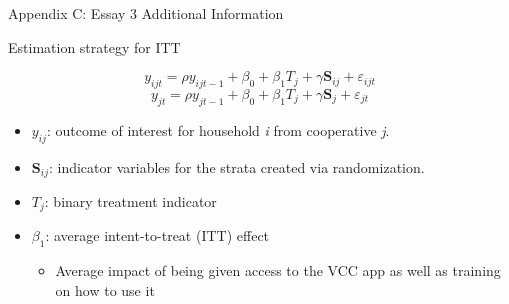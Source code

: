 \documentclass[aspectratio=169]{beamer}
\newenvironment{wideitemize}{\itemize\addtolength{\itemsep}{10pt}}{\enditemize}
\begin{document}
\begin{frame}{Appendix C: Essay 3 Additional Information}

\begin{wideitemize}
    \item Estimation strategy for ITT

\begin{equation} \label{eq:ITT1}
y_{ijt} = \rho y_{ijt-1} + \beta_{0} + \beta_{1} T_{j} + \gamma \textbf{S}_{ij} + \varepsilon_{ijt}
\end{equation}
\begin{equation} \label{eq:ITT2}
y_{jt} = \rho y_{jt-1} + \beta_{0} + \beta_{1} T_{j} + \gamma \textbf{S}_{j} + \varepsilon_{jt}
\end{equation}

    \vspace{.25cm}
    \begin{itemize}
        \item $y_{ij}$: outcome of interest for household \textit{i} from cooperative \textit{j}. \item $\textbf{S}_{ij}$: indicator variables for the strata created via randomization. \item $T_{j}$: binary treatment indicator
        \item $\beta_{1}$: average intent-to-treat (ITT) effect
            \begin{itemize}
                \item Average impact of being given access to the VCC app as well as training on how to use it
            \end{itemize}
    \end{itemize}
\end{wideitemize}
\end{frame}
\end{document}
